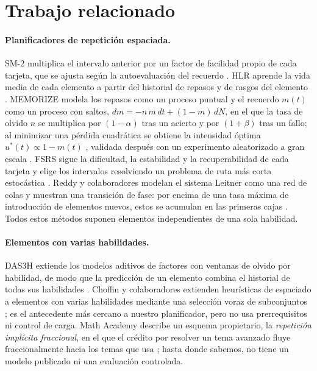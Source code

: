 \documentclass[runningheads]{llncs}
\begin{document}
\section{Trabajo relacionado}

\paragraph{Planificadores de repetición espaciada.} SM-2 multiplica el intervalo anterior por un factor de facilidad propio de cada tarjeta, que se ajusta según la autoevaluación del recuerdo \cite{wozniak1990}. HLR aprende la vida media de cada elemento a partir del historial de repasos y de rasgos del elemento \cite{settles2016}. MEMORIZE modela los repasos como un proceso puntual y el recuerdo $m(t)$ como un proceso con saltos, $dm=-n\,m\,dt+(1-m)\,dN$, en el que la tasa de olvido $n$ se multiplica por $(1-\alpha)$ tras un acierto y por $(1+\beta)$ tras un fallo; al minimizar una pérdida cuadrática se obtiene la intensidad óptima $u^\ast(t)\propto1-m(t)$ \cite{tabibian2019}, validada después con un experimento aleatorizado a gran escala \cite{upadhyay2021}. FSRS sigue la dificultad, la estabilidad y la recuperabilidad de cada tarjeta y elige los intervalos resolviendo un problema de ruta más corta estocástica \cite{ye2022,su2023}. Reddy y colaboradores modelan el sistema Leitner como una red de colas y muestran una transición de fase: por encima de una tasa máxima de introducción de elementos nuevos, estos se acumulan en las primeras cajas \cite{reddy2016}. Todos estos métodos suponen elementos independientes de una sola habilidad.

\paragraph{Elementos con varias habilidades.} DAS3H extiende los modelos aditivos de factores con ventanas de olvido por habilidad, de modo que la predicción de un elemento combina el historial de todas sus habilidades \cite{choffin2019}. Choffin y colaboradores extienden heurísticas de espaciado a elementos con varias habilidades mediante una selección voraz de subconjuntos \cite{choffin2021}; es el antecedente más cercano a nuestro planificador, pero no usa prerrequisitos ni control de carga. Math Academy describe un esquema propietario, la \emph{repetición implícita fraccional}, en el que el crédito por resolver un tema avanzado fluye fraccionalmente hacia los temas que usa \cite{skycak2023}; hasta donde sabemos, no tiene un modelo publicado ni una evaluación controlada.
\end{document}
